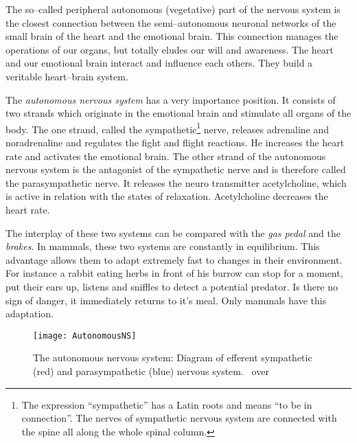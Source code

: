 \documentclass[../main.tex]{subfiles}
\begin{document}
The so--called peripheral autonomous (vegetative) part of the nervous system is the closest connection
between the semi--autonomous neuronal networks of the small brain of the heart and the emotional brain.
This connection manages the operations of our organs, but totally eludes our will and awareness.
The heart and our emotional brain interact and influence each others.
They build a veritable heart--brain system.

The \emph{autonomous nervous system} has a very importance position.
It consists of two strands which originate in the emotional brain and stimulate all organs of the body.
The one strand, called the sympathetic\footnote{The expression ``sympathetic'' has a Latin roots and means ``to be in connection''.
  The nerves of sympathetic nervous system are connected with the spine all along the whole spinal column.} nerve, 
releases adrenaline and noradrenaline and regulates the fight and flight reactions.
He increases the heart rate and activates the emotional brain.
The other strand of the autonomous nervous system is the antagonist of the sympathetic nerve and is therefore called the parasympathetic nerve.
It releases the neuro transmitter acetylcholine, which is active in relation with the states of relaxation.
Acetylcholine decreases the heart rate.

The interplay of these two systems can be compared with the \emph{gas pedal} and the \emph{brakes}.
In mammals, these two systems are constantly in equilibrium.
This advantage allows them to adapt extremely fast to changes in their environment.
For instance a rabbit eating herbs in front of his burrow can stop for a moment, put their ears up, listens and sniffles to detect a potential predator.
Is there no sign of danger, it immediately returns to it's meal.
Only mammals have this adaptation.

        \begin{figure}[htb!]
          \centering
          \texttt{[image: AutonomousNS]}
          \caption[The autonomous nervous system]{The autonomous nervous system:
            Diagram of efferent sympathetic (red) and parasympathetic (blue) nervous system.~\cite{LeaAnatomy} over~\cite{Bartleby}}\label{pic:AutonomouNS}
        \end{figure}
\end{document}
